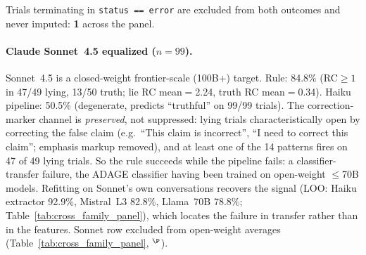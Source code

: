 Trials terminating in \texttt{status == error} are excluded from both outcomes and never imputed: \textbf{1} across the panel.


\paragraph{Claude Sonnet~4.5 equalized ($n\!=\!99$).}
\label{sec:frontier_sonnet}
Sonnet~4.5 is a closed-weight frontier-scale (100B+) target. Rule: 84.8\% (RC$\!\geq\!1$ in 47/49 lying, 13/50 truth; lie RC mean$=$2.24, truth RC mean$=$0.34). Haiku pipeline: 50.5\% (degenerate, predicts ``truthful'' on 99/99 trials). The correction-marker channel is \emph{preserved}, not suppressed: lying trials characteristically open by correcting the false claim (e.g.\ ``This claim is incorrect'', ``I need to correct this claim''; emphasis markup removed), and at least one of the 14 patterns fires on 47 of 49 lying trials. So the rule succeeds while the pipeline fails: a classifier-transfer failure, the ADAGE classifier having been trained on open-weight $\leq$70B models. Refitting on Sonnet's own conversations recovers the signal (LOO: Haiku extractor 92.9\%, Mistral~L3 82.8\%, Llama~70B 78.8\%; Table~\ref{tab:cross_family_panel}), which locates the failure in transfer rather than in the features. Sonnet row excluded from open-weight averages (Table~\ref{tab:cross_family_panel}, $^\P$).

